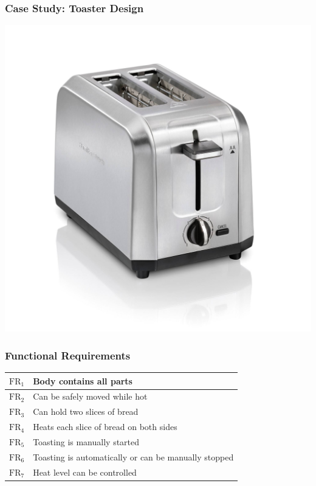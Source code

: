 \documentclass{beamer}
\newcommand{\FR}{\text{FR}}
\begin{document}
\begin{frame}
  \frametitle{Case Study: Toaster Design}
  \begin{center}
    \includegraphics[scale=0.1]{toaster}
  \end{center}
\end{frame}

\begin{frame}
  \frametitle{Functional Requirements}
  \begin{center}
    \begin{tabular}{|c|l|}
      \hline
      \(\FR_1\) & Body contains all parts \\
      \hline
      \(\FR_2\) & Can be safely moved while hot \\
      \hline
      \(\FR_3\) & Can hold two slices of bread \\
      \hline
      \(\FR_4\) & Heats each slice of bread on both sides \\
      \hline
      \(\FR_5\) & Toasting is manually started \\
      \hline
      \(\FR_6\) & Toasting is automatically or can be manually stopped \\
      \hline
      \(\FR_7\) & Heat level can be controlled \\
      \hline
    \end{tabular}
  \end{center}
\end{frame}
\end{document}
